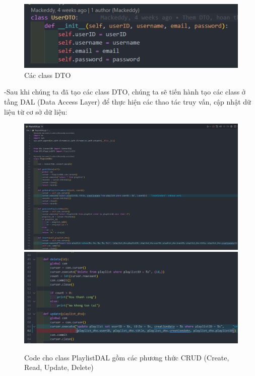 \documentclass[a4paper]{article}
\begin{document}
\newpage
\begin{flushleft}
	\begin{figure}[h]
		\includegraphics[width=\textwidth]{UserDTO.png}
		\caption{Các class DTO}
	\end{figure}
	-Sau khi chúng ta đã tạo các class DTO, chúng ta sẽ tiến hành tạo các class ở tầng DAL (Data Access Layer) để thực hiện các thao tác truy vấn, cập nhật dữ liệu từ cơ sở dữ liệu:
	\begin{figure}[h]
		\centering
		\includegraphics[width=\textwidth]{PlaylistDAL-1.png}
		\includegraphics[width=\textwidth]{PlaylistDAL-2.png}
		\caption{Code cho class PlaylistDAL gồm các phương thức CRUD (Create, Read, Update, Delete)}
	\end{figure}
\end{flushleft}
\end{document}
